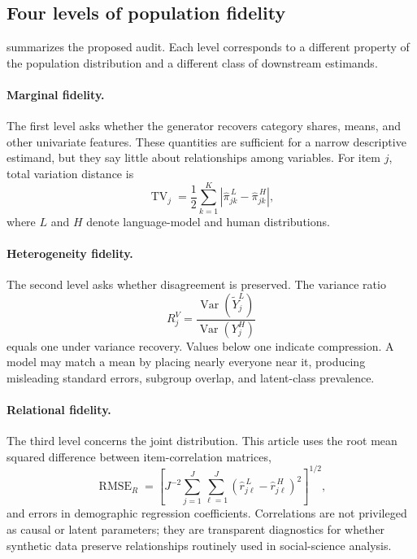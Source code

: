\documentclass[10pt,twocolumn]{article}
\newcommand{\Var}{\operatorname{Var}}
\newcommand{\TV}{\operatorname{TV}}
\newcommand{\RMSE}{\operatorname{RMSE}}
\begin{document}
\subsection{Four levels of population fidelity}

 summarizes the proposed audit. Each level corresponds to a different
property of the population distribution and a different class of downstream estimands.

\paragraph{Marginal fidelity.}
The first level asks whether the generator recovers category shares, means, and other univariate
features. These quantities are sufficient for a narrow descriptive estimand, but they say little
about relationships among variables. For item $j$, total variation distance is
\begin{equation}
  \TV_j
  =
  \frac{1}{2}\sum_{k=1}^{K}
  \left|\widehat{\pi}^{\,L}_{jk}-\widehat{\pi}^{\,H}_{jk}\right|,
  \label{eq:tv}
\end{equation}
where $L$ and $H$ denote language-model and human distributions.

\paragraph{Heterogeneity fidelity.}
The second level asks whether disagreement is preserved. The variance ratio
\begin{equation}
  R^{V}_{j}
  =
  \frac{\Var(\widetilde{Y}^{L}_{j})}{\Var(Y^{H}_{j})}
  \label{eq:variance}
\end{equation}
equals one under variance recovery. Values below one indicate compression. A model may match a mean
by placing nearly everyone near it, producing misleading standard errors, subgroup overlap, and
latent-class prevalence.

\paragraph{Relational fidelity.}
The third level concerns the joint distribution. This article uses the root mean squared difference
between item-correlation matrices,
\begin{equation}
  \RMSE_R
  =
  \left[
    J^{-2}
    \sum_{j=1}^{J}\sum_{\ell=1}^{J}
    \left(\widehat r^{\,L}_{j\ell}-\widehat r^{\,H}_{j\ell}\right)^2
  \right]^{1/2},
  \label{eq:corr-rmse}
\end{equation}
and errors in demographic regression coefficients. Correlations are not privileged as causal or
latent parameters; they are transparent diagnostics for whether synthetic data preserve
relationships routinely used in social-science analysis.
\end{document}
